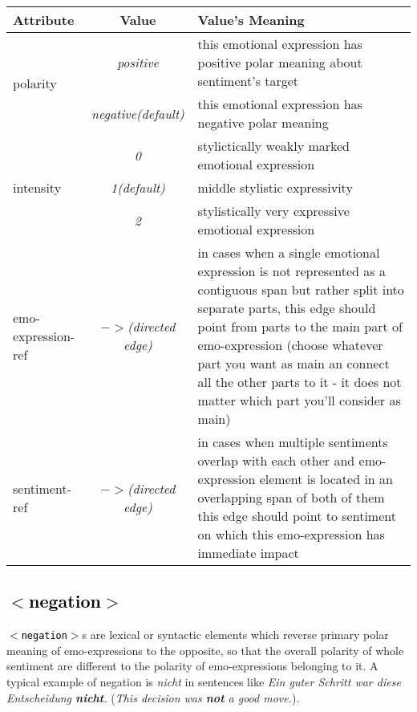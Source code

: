 \documentclass[11pt,a4paper]{article}
\newcommand{\xmltag}[1]{\textcolor{black}{{\small$<$#1$>$}}}
\begin{document}
\begin{tabular}{|l|c|p{}|}\hline
  Attribute & Value & Value's Meaning\\\hline

  \multirow{2}{*}{polarity} & \textit{positive} & this emotional
  expression has positive polar meaning about sentiment's
  target\\\cline{2-3}

  & \textit{negative\newline(default)} & this emotional expression has
  negative polar meaning\\\hline


  \multirow{3}{*}{intensity} & \textit{0} & stylictically weakly
  marked emotional expression\\\cline{2-3}

  & \textit{1\newline(default)} & middle stylistic
  expressivity\\\cline{2-3}

  & \textit{2} & stylistically very expressive emotional
  expression\\\hline


  emo-expression-ref & \textit{$->$\newline(directed edge)} & in cases
  when a single emotional expression is not represented as a
  contiguous span but rather split into separate parts, this edge
  should point from parts to the main part of emo-expression (choose
  whatever part you want as main an connect all the other parts to it
  - it does not matter which part you'll consider as main)\\\hline


  sentiment-ref & \textit{$->$\newline(directed edge)} & in cases when
  multiple sentiments overlap with each other and emo-expression
  element is located in an overlapping span of both of them this edge
  should point to sentiment on which this emo-expression has immediate
  impact\\\hline
\end{tabular}


\subsection{\xmltag{negation}}
\texttt{\xmltag{negation}}s are lexical or syntactic elements which
reverse primary polar meaning of emo-expressions to the opposite, so
that the overall polarity of whole sentiment are different to the
polarity of emo-expressions belonging to it. A typical example of
negation is \textit{nicht} in sentences like \textit{Ein guter Schritt
  war diese Entscheidung \textbf{nicht}.} (\textit{This decision was
  \textbf{not} a good move.}).
\end{document}
